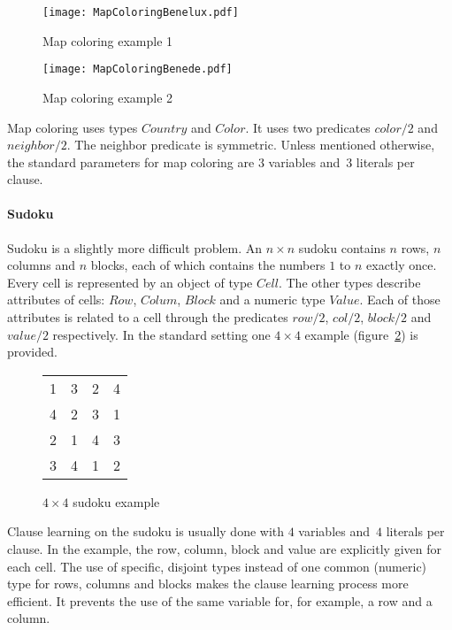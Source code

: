 \begin{figure}
\centering
\begin{minipage}{.5\textwidth}
  \centering
  \texttt{[image: MapColoringBenelux.pdf]}
  \caption{Map coloring example 1}
  \label{fig:setup_mapcolor_benelux}
\end{minipage}
\begin{minipage}{.5\textwidth}
  \centering
  \texttt{[image: MapColoringBenede.pdf]}
  \caption{Map coloring example 2}
  \label{fig:setup_mapcolor_benede}
\end{minipage}
\end{figure}

Map coloring uses types $\mathit{Country}$ and $\mathit{Color}$.
It uses two predicates $\mathit{color/2}$ and $\mathit{neighbor/2}$.
The neighbor predicate is symmetric.
Unless mentioned otherwise, the standard parameters for map coloring are $3$ variables and~$3$ literals per clause.

\paragraph{Sudoku}
Sudoku is a slightly more difficult problem.
An $n \times n$ sudoku contains $n$ rows, $n$ columns and $n$ blocks, each of which contains the numbers $1$ to $n$ exactly once.
Every cell is represented by an object of type $\mathit{Cell}$.
The other types describe attributes of cells: $\mathit{Row}$, $\mathit{Colum}$, $\mathit{Block}$ and a numeric type $\mathit{Value}$.
Each of those attributes is related to a cell through the predicates $\mathit{row/2}$, $\mathit{col/2}$, $\mathit{block/2}$ and $\mathit{value/2}$ respectively.
In the standard setting one $4 \times 4$ example (figure~\ref{fig:setup_sudoku}) is provided.

\begin{figure}[!htp]
	\centering
	\begin{tabular}{|cc|cc|}
		\hline
		1 & 3 & 2 & 4 \\
		4 & 2 & 3 & 1 \\ \hline
		2 & 1 & 4 & 3 \\
		3 & 4 & 1 & 2 \\ \hline
	\end{tabular}
	\caption{$4 \times 4$ sudoku example}
	\label{fig:setup_sudoku}
\end{figure}

Clause learning on the sudoku is usually done with $4$ variables and~$4$ literals per clause.
In the example, the row, column, block and value are explicitly given for each cell.
The use of specific, disjoint types instead of one common (numeric) type for rows, columns and blocks makes the clause learning process more efficient.
It prevents the use of the same variable for, for example, a row and a column.

